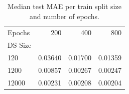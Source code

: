 \begin{table}
\caption{Median test MAE per train split size and number of epochs.}
\label{tab:ds_size_median_mae}
\begin{tabular}{lrrr}
\toprule
Epochs & 200 & 400 & 800 \\
DS Size &  &  &  \\
\midrule
120 & 0.03640 & 0.01700 & 0.01359 \\
1200 & 0.00857 & 0.00267 & 0.00247 \\
12000 & 0.00231 & 0.00208 & 0.00204 \\
\bottomrule
\end{tabular}
\end{table}
